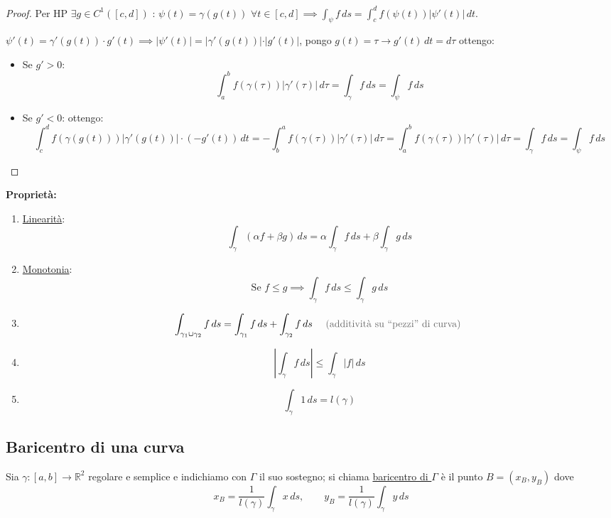 \begin{proof}
Per HP $\exists g \in C^1([c, d])$  : $\psi(t) = \gamma(g(t))$ $\forall t \in [c, d] \implies \int_\psi f \, ds = \int_c^d f(\psi(t)) \vert \psi'(t) \vert \, dt$.

$\psi'(t) = \gamma'(g(t)) \cdot g'(t) \implies \vert \psi'(t) \vert = \vert \gamma'(g(t)) \vert \cdot \vert g'(t) \vert$, pongo $g(t) = \tau \to g'(t) \, dt = d\tau$ ottengo:
\begin{itemize}
    \item Se $g' > 0$:
    \[
    \int_a^b f(\gamma(\tau)) \vert \gamma'(\tau) \vert \, d\tau = \int_\gamma f \, ds = \int_\psi f \, ds
    \]
    \item Se $g' < 0$: ottengo:
    \[
    \int_c^d f(\gamma(g(t))) \vert \gamma'(g(t)) \vert \cdot (-g'(t)) \, dt = -\int_b^a f(\gamma(\tau)) \vert \gamma'(\tau) \vert \, d\tau = \int_a^b f(\gamma(\tau)) \vert \gamma'(\tau) \vert \, d\tau = \int_\gamma f \, ds = \int_\psi f \, ds
    \]
\end{itemize}
\end{proof}

\textbf{Proprietà:}
\begin{enumerate}
    \item \underline{Linearità}:
    \[
    \int_\gamma (\alpha f + \beta g) \, ds = \alpha \int_\gamma f \, ds + \beta \int_\gamma g \, ds
    \]
    \item \underline{Monotonia}:
    \[
    \text{Se } f \le g \implies \int_\gamma f \, ds \le \int_\gamma g \, ds
    \]
    \item \[
    \int_{\gamma_1 \cup \gamma_2} f \, ds = \int_{\gamma_1} f \, ds + \int_{\gamma_2} f \, ds \quad \text{\pencilnote{(additività su ``pezzi'' di curva)}}
    \]
    \item \[
    \left\vert \int_\gamma f \, ds \right\vert \le \int_\gamma \vert f \vert \, ds
    \]
    \item \[
    \int_\gamma 1 \, ds = l(\gamma)
    \]
\end{enumerate}

\subsection{Baricentro di una curva}

\begin{definition}
Sia $\gamma : [a, b] \to \mathbb{R}^2$ regolare e semplice e indichiamo con $\Gamma$ il suo sostegno; si chiama \underline{baricentro di $\Gamma$} è il punto $B = (x_B, y_B)$ dove
\[
x_B = \frac{1}{l(\gamma)} \int_\gamma x \, ds, \qquad y_B = \frac{1}{l(\gamma)} \int_\gamma y \, ds
\]
\end{definition}

